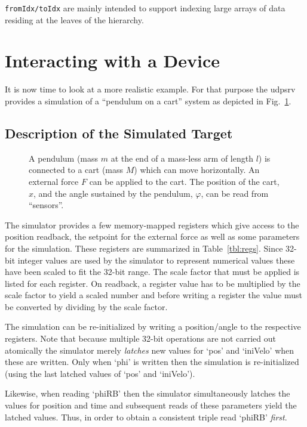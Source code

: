 \documentclass[10pt]{article}
\newcommand{\udps}      {udpsrv}
\newcommand{\cod}[1] {{\tt#1}}
\newcounter{figs}
\newcommand{\fig}[2]{
\refstepcounter{figs}
\hspace*{\fill}\resizebox{#1}{!}{\texttt{[image: \#2]}}\hspace*{\fill}
}
\newcommand{\figr}[1]{Fig.~\ref{fig:#1}}
\begin{document}
\cod{fromIdx/toIdx} are mainly intended to support indexing large arrays of data
residing at the leaves of the hierarchy.

\section{Interacting with a Device}

It is now time to look at a more realistic example. For that purpose the \udps{}
provides a simulation of a ``pendulum on a cart'' system as depicted in \figr{geom}.

\subsection{Description of the Simulated Target}

\begin{figure}[ht]
\fig{0.5\textwidth}{O.Common/geom.pdf}
\label{fig:geom}
\caption{A pendulum (mass $m$ at the end of a mass-less arm of length $l$) is connected
to a cart (mass $M$) which can move horizontally. An external force $F$ can be applied
to the cart. The position of the cart, $x$, and the angle sustained by the pendulum,
$\varphi$, can be read from ``sensors''.}
\end{figure}

The simulator provides a few memory-mapped registers which give access to the
position readback, the setpoint for the external force as well as some parameters
for the simulation. These registers are summarized in Table~\ref{tbl:regs}.
Since 32-bit integer values are used by the simulator to represent numerical values
these have been scaled to fit the 32-bit range. The scale factor that must be applied
is listed for each register. On readback, a register value has to be multiplied
by the scale factor to yield a scaled number and before writing a register the
value must be converted by dividing by the scale factor.

The simulation can be re-initialized by writing a position/angle to the respective
registers. Note that because multiple 32-bit operations are not carried out atomically
the simulator merely {\em latches} new values for `pos' and `iniVelo' when these
are written. Only when `phi' is written then the simulation is re-initialized
(using the last latched values of `pos' and `iniVelo').

Likewise, when reading `phiRB' then the simulator simultaneously latches the
values for position and time and subsequent reads of these parameters yield the
latched values. Thus, in order to obtain a consistent triple read `phiRB' {\em first}.
\end{document}
